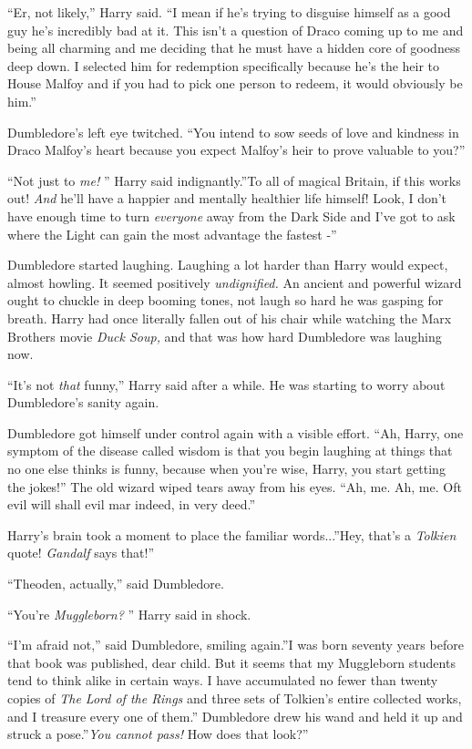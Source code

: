 ``Er, not likely,'' Harry said. ``I mean if he's trying to disguise
himself as a good guy he's incredibly bad at it. This isn't a question
of Draco coming up to me and being all charming and me deciding that he
must have a hidden core of goodness deep down. I selected him for
redemption specifically because he's the heir to House Malfoy and if you
had to pick one person to redeem, it would obviously be him.''

Dumbledore's left eye twitched. ``You intend to sow seeds of love and
kindness in Draco Malfoy's heart because you expect Malfoy's heir to
prove valuable to you?''

``Not just to \emph{me!} '' Harry said indignantly.''To all of magical
Britain, if this works out! \emph{And} he'll have a happier and mentally
healthier life himself! Look, I don't have enough time to turn
\emph{everyone} away from the Dark Side and I've got to ask where the
Light can gain the most advantage the fastest -''

Dumbledore started laughing. Laughing a lot harder than Harry would
expect, almost howling. It seemed positively \emph{undignified.} An
ancient and powerful wizard ought to chuckle in deep booming tones, not
laugh so hard he was gasping for breath. Harry had once literally fallen
out of his chair while watching the Marx Brothers movie \emph{Duck
Soup,} and that was how hard Dumbledore was laughing now.

``It's not \emph{that} funny,'' Harry said after a while. He was starting
to worry about Dumbledore's sanity again.

Dumbledore got himself under control again with a visible effort. ``Ah,
Harry, one symptom of the disease called wisdom is that you begin
laughing at things that no one else thinks is funny, because when you're
wise, Harry, you start getting the jokes!'' The old wizard wiped tears
away from his eyes. ``Ah, me. Ah, me. Oft evil will shall evil mar
indeed, in very deed.''

Harry's brain took a moment to place the familiar words...''Hey,
that's a \emph{Tolkien} quote! \emph{Gandalf} says that!''

``Theoden, actually,'' said Dumbledore.

``You're \emph{Muggleborn?} '' Harry said in shock.

``I'm afraid not,'' said Dumbledore, smiling again.''I was born seventy
years before that book was published, dear child. But it seems that my
Muggleborn students tend to think alike in certain ways. I have
accumulated no fewer than twenty copies of \emph{The Lord of the Rings}
and three sets of Tolkien's entire collected works, and I treasure every
one of them.'' Dumbledore drew his wand and held it up and struck a
pose.''\emph{You cannot pass!} How does that look?''

